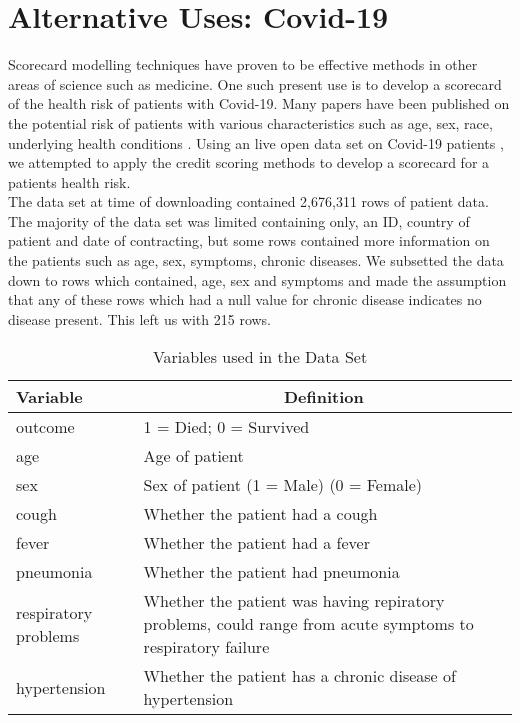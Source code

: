 \chapter{Alternative Uses: Covid-19} \label{chapter:5}

Scorecard modelling techniques have proven to be effective methods in other areas of science such as medicine. One such present use is to develop a scorecard of the health risk of patients with Covid-19. Many papers have been published on the potential risk of patients with various characteristics such as age, sex, race, underlying health conditions \parencite{du2020predictors}. Using an live open data set on Covid-19 patients \parencite{kraemer2020epidemiological}, we attempted to apply the credit scoring methods to develop a scorecard for a patients health risk. \\ 

The data set at time of downloading contained 2,676,311 rows of patient data. The majority of the data set was limited containing only, an ID, country of patient and date of contracting, but some rows contained more information on the patients such as age, sex, symptoms, chronic diseases. We subsetted the data down to rows which contained, age, sex and symptoms and made the assumption that any of these rows which had a null value for chronic disease indicates no disease present. This left us with 215 rows. \\

\begin{table}[H]
	\centering
	\renewcommand{\arraystretch}{1.25}
	\begin{tabular}{l p{10cm}}
	\hline
	Variable & \multicolumn{1}{c}{Definition}\\ 
	\hline
	outcome & 1 = Died; 0 = Survived \\
	age & Age of patient \\
	sex & Sex of patient (1 = Male) (0 = Female) \\
	cough & Whether the patient had a cough \\
	fever & Whether the patient had a fever \\
	pneumonia & Whether the patient had pneumonia \\
	respiratory problems & Whether the patient was having repiratory problems, could range from acute symptoms to respiratory failure \\
	hypertension & Whether the patient has a chronic disease of hypertension \\
	\end{tabular}
	\caption{Variables used in the Data Set \label{CovidData}}
\end{table}

